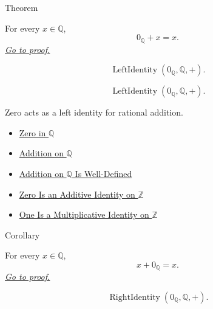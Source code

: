 \begin{theorembox}{Theorem}
\begin{theorem}
\label{thm:zero-left-additive-identity-on-q}
For every $x\in\mathbb{Q}$,
\[
0_{\mathbb{Q}}+x=x.
\]
\hyperref[prf:zero-left-additive-identity-on-q]{\textit{Go to proof.}}
\end{theorem}
\end{theorembox}

\begin{remark*}
\[
\operatorname{LeftIdentity}(0_{\mathbb{Q}},\mathbb{Q},+).
\]
\end{remark*}

\begin{remark*}
\[
\operatorname{LeftIdentity}(0_{\mathbb{Q}},\mathbb{Q},+).
\]
\end{remark*}

\begin{remark*}[Interpretation]
Zero acts as a left identity for rational addition.
\end{remark*}

\begin{dependencies}
\begin{itemize}
  \item \hyperref[def:zero-in-q]{Zero in $\mathbb{Q}$}
  \item \hyperref[def:addition-on-q-classes]{Addition on $\mathbb{Q}$}
  \item \hyperref[thm:addition-on-q-well-defined]{Addition on $\mathbb{Q}$ Is Well-Defined}
  \item \hyperref[thm:zero-additive-identity-on-z]{Zero Is an Additive Identity on $\mathbb{Z}$}
  \item \hyperref[thm:one-multiplicative-identity-on-z]{One Is a Multiplicative Identity on $\mathbb{Z}$}
\end{itemize}
\end{dependencies}

\begin{corollarybox}{Corollary}
\begin{corollary}
\label{cor:zero-right-additive-identity-on-q}
For every $x\in\mathbb{Q}$,
\[
x+0_{\mathbb{Q}}=x.
\]
\hyperref[prf:zero-right-additive-identity-on-q]{\textit{Go to proof.}}
\end{corollary}
\end{corollarybox}

\begin{remark*}
\[
\operatorname{RightIdentity}(0_{\mathbb{Q}},\mathbb{Q},+).
\]
\end{remark*}

